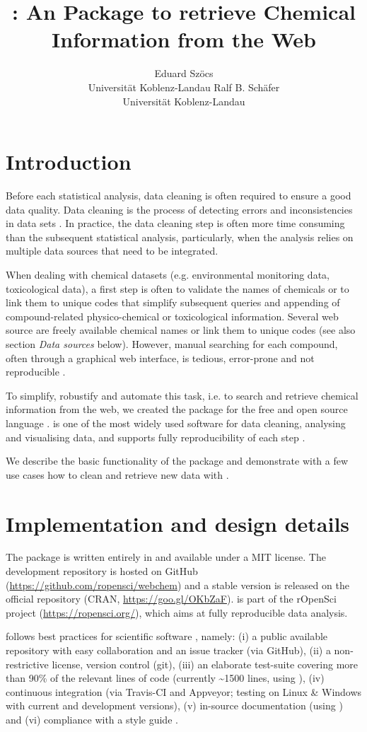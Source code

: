 \documentclass[article, shortnames]{jss}\usepackage[]{graphicx}\usepackage[]{color}
\author{Eduard Sz\"ocs\\Universit\"at Koblenz-Landau \And 
        Ralf B. Sch\"afer\\Universit\"at Koblenz-Landau}
\title{\pkg{webchem}: An \proglang{R} Package to retrieve Chemical Information from the Web}
\begin{document}
\section[Introduction]{Introduction}
Before each statistical analysis, data cleaning is often required to ensure a good data quality.
Data cleaning is the process of detecting errors and inconsistencies in data sets \citep{Chapman_2005}.
In practice, the data cleaning step is often more time consuming than the subsequent statistical analysis, particularly, when the analysis relies on multiple data sources that need to be integrated.

When dealing with chemical datasets (e.g. environmental monitoring data, toxicological data), a first step is often to validate the names of chemicals or to link them to unique codes that simplify subsequent queries and appending of compound-related physico-chemical or toxicological information.
Several web source are freely available chemical names or link them to unique codes (see also section \emph{Data sources} below).
However, manual searching for each compound, often through a graphical web interface, is tedious, error-prone and not reproducible \citep{Peng_2009}.

To simplify, robustify and automate this task, i.e. to search and retrieve chemical information from the web, we created the  package for the free and open source  language \citep{r_2015, Wehrens_2011}.
 is one of the most widely used software for data cleaning, analysing and visualising data, and supports fully reproducibility of each step \citep{Marwick_2016}.

We describe the basic functionality of the package and demonstrate with a few use cases how to clean and retrieve new data with .


\section[Implementation and design details]{Implementation and design details}
The  package is written entirely in  and available under a MIT license.
The development repository is hosted on GitHub (\url{https://github.com/ropensci/webchem}) and a stable version is released on the official  repository (CRAN, \url{https://goo.gl/OKbZaF}).
 is part of the rOpenSci project (\url{https://ropensci.org/}), which aims at fully reproducible data analysis.

 follows best practices for scientific software \citep{wilson_best_2014, poisot_best_2015}, namely: (i) a public available repository with easy collaboration and an issue tracker (via GitHub), (ii) a non-restrictive license, version control (git), (iii) an elaborate test-suite covering more than 90\% of the relevant lines of code (currently \textasciitilde 1500 lines, using  \citep{wickham_testthat:_2011}), (iv) continuous integration (via Travis-CI and Appveyor; testing on Linux \& Windows with current and development  versions), (v) in-source documentation (using  \citep{wickham_roxygen2:_2015}) and (vi) compliance with a style guide \citep{wickham_advanced_2015}.
\end{document}
